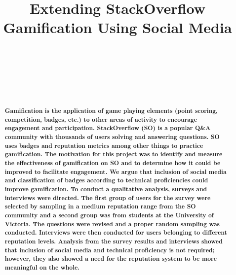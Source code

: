 \documentclass{sigchi}
\def\plaintitle{Extending StackOverflow Gamification Using Social Media}
\begin{document}
\title{\plaintitle}

\author{%
	\\
	\\
	\\
	\\
	\\
}

\maketitle

\begin{abstract}
\textbf{Gamification is the application of game playing elements (point scoring, competition, badges, etc.) to other areas of activity to encourage engagement and participation. StackOverflow (SO) is a popular Q\&A community with thousands of users solving and answering questions. SO uses badges and reputation metrics among other things to practice gamification.  The motivation for this project was to identify and measure the effectiveness of gamification on SO and to determine how it could be improved to facilitate engagement. We argue that inclusion of social media and classification of badges according to technical proficiencies could improve gamification. To conduct a qualitative analysis, surveys and interviews were directed. The first group of users for the survey were selected by sampling in a medium reputation range from the SO community and a second group was from students at the University of Victoria. The questions were revised and a proper random sampling was conducted. Interviews were then conducted for users belonging to different reputation levels. Analysis from the survey results and interviews showed that inclusion of social media and technical proficiency is not required; however, they also showed a need for the reputation system to be more meaningful on the whole.}
\end{abstract}
\end{document}
